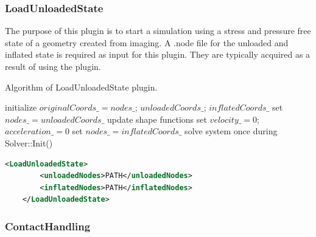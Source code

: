 \subsubsection{LoadUnloadedState}
The purpose of this plugin is to start a simulation using a stress and pressure free state of a geometry created from imaging.
A .node file for the unloaded and inflated state is required as input for this plugin.
They are typically acquired as a result of using the  plugin.

\begin{algorithm}
\caption{Algorithm of LoadUnloadedState plugin.}
\begin{algorithmic}[1]
\State initialize $originalCoords\_ = nodes\_$; $unloadedCoords\_$; $inflatedCoords\_$
\State set $nodes\_ = unloadedCoords\_$
\State update shape functions
\State set $velocity\_ = 0$; $acceleration\_ = 0$
\State set $nodes\_ = inflatedCoords\_$
\State solve system once during Solver::Init()
\EndProcedure
\end{algorithmic}
\end{algorithm}

\begin{lstlisting}[language=XML,caption=.xml settings for LoadUnloadedState plugin]
    <LoadUnloadedState>
        <unloadedNodes>PATH</unloadedNodes>
        <inflatedNodes>PATH</inflatedNodes>
    </LoadUnloadedState>
\end{lstlisting}

\subsubsection{ContactHandling}
\label{plugin:ContactHandling}

